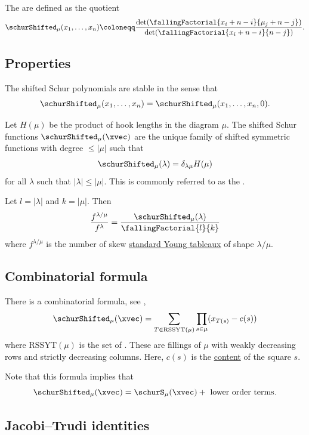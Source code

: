 The \label{shiftedSchurPolynomialDefinition}
are defined as the quotient
\[
\schurShifted_\mu(x_1,\dotsc,x_n) \coloneqq
\frac{ \det( \fallingFactorial{x_i+n-i}{\mu_j+n-j} ) }
{ \det( \fallingFactorial{x_i+n-i}{n-j} ) }.
\]


\subsection[schurShiftedProperties]{Properties}

The shifted Schur polynomials are stable in the sense that
\[
\schurShifted_\mu(x_1,\dotsc,x_n) = \schurShifted_\mu(x_1,\dotsc,x_n,0).
\]

Let $H(\mu)$ be the product of hook lengths in the diagram $\mu$.
The shifted Schur functions $\schurShifted_\mu(\xvec)$
are the unique family of shifted symmetric functions with degree $\leq |\mu|$
such that 
\[
\schurShifted_\mu(\lambda) = \delta_{\lambda\mu} H(\mu)
\]
for all $\lambda$ such that $|\lambda| \leq |\mu|$.
This is commonly referred to as the
\label{shiftedSchurVanishingProperty}.


Let $l=|\lambda|$ and $k=|\mu|$. 
Then
\[
\frac{f^{\lambda/\mu}}{f^{\lambda}} = \frac{\schurShifted_\mu(\lambda)}{\fallingFactorial{l}{k}}
\]
where $f^{\lambda/\mu}$ is the number of skew
\hyperref[standardYoungTableau]{standard Young tableaux} of shape
$\lambda/\mu$.


\subsection[schurShiftedCombinatorialFormula]{Combinatorial formula}

There is a combinatorial formula, see \cite{OkounkovOlshanski1996},
\[
\schurShifted_\mu(\xvec) = \sum_{T \in \mathrm{RSSYT}(\mu)} \prod_{s \in \mu} (x_{T(s)} - c(s))
\]
where $\mathrm{RSSYT}(\mu)$ is the set of
\label{reverseSemistandardYoungTableau}.
These are fillings of $\mu$ with weakly decreasing rows and strictly decreasing columns.
Here, $c(s)$ is the \hyperref[contentOfBox]{content} of the square $s$.

Note that this formula implies that
\[
\schurShifted_\mu(\xvec) = \schurS_\mu(\xvec) + \text{ lower order terms}.
\]


\subsection[schurShiftedJacobiTrudi]{Jacobi--Trudi identities}

